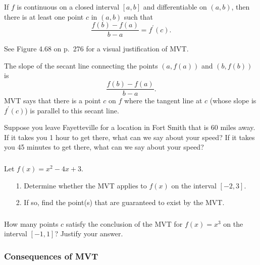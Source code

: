 \documentclass[cal1spr16Lectures.tex]{subfiles}
\begin{document}
\begin{frame}
\begin{thm}  If $f$ is continuous on a closed interval $[a,b]$ and differentiable on $(a,b)$, then there is at least one point $c$ in $(a,b)$ such that 
\[
\frac{f(b)-f(a)}{b-a}=f^{\prime}(c).
\]
\end{thm}
See Figure 4.68 on p.\ 276 for a visual justification of MVT.
\end{frame}

\begin{frame}\small  
The slope of the secant line connecting the points $(a,f(a))$ and $(b,f(b))$ is 
\[\dfrac{f(b)-f(a)}{b-a}.\]  
MVT says that there is a point $c$ on $f$ where the tangent line at $c$ (whose slope is $f^{\prime}(c)$) is parallel to this secant line.  
\begin{que}
Suppose you leave Fayetteville for a location in Fort Smith that is 60 miles away.  If it takes you 1 hour to get there, what can we say about your speed?  If it takes you 45 minutes to get there, what can we say about your speed?
\end{que}
\end{frame}

\begin{frame}%
\frametitle{}
\begin{ex} Let $f(x)=x^2-4x+3.$
\begin{itemize}
\item[1.] Determine whether the MVT applies to $f(x)$ on the interval $[-2,3]$.
\item[2.] If so, find the point(s) that are guaranteed to exist by the MVT.
\end{itemize}
\end{ex}
\end{frame}

\begin{frame}%
\frametitle{}
\begin{ex} How many points $c$ satisfy the conclusion of the MVT for $f(x)=x^3$ on the interval $[-1,1]$?  Justify your answer. \end{ex}
\end{frame}

\subsubsection{Consequences of MVT}
\end{document}
